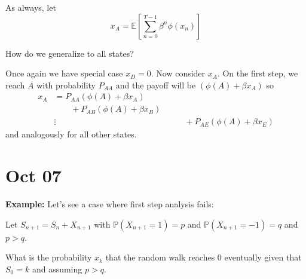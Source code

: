 \documentclass[12pt]{report}
\renewcommand{\P}{\mathbb{P}}
\newcommand{\E}{\mathbb{E}}
\begin{document}
    As always, let 
    \[x_A = \E\left[\sum_{n=0}^{T-1} \beta^n \phi(x_n) \right]\]
    
    How do we generalize to all states? 
    
    Once again we have special case $x_D = 0$. Now consider $x_A$. On the first step, we reach $A$ with probability $P_{AA}$ and the payoff will be $(\phi(A) + \beta x_A)$ so 
    \begin{align*}
        x_A &= P_{AA} (\phi(A) + \beta x_A)\\ 
        &\qquad + P_{AB}(\phi(A) + \beta x_B)\\ 
        &\vdots 
        &\qquad + P_{AE}(\phi(A) + \beta x_E)
    \end{align*}
    and analogously for all other states.

\section{Oct 07}
    \textbf{Example:} Let's see a case where first step analysis fails: 

    Let $S_{n+1} = S_n + X_{n+1}$ with $\P(X_{n+1} = 1) = p$ and $\P(X_{n+1} = -1) = q$ and $p> q$.

    \begin{center}
    \end{center}

    What is the probability $x_k$ that the random walk reaches $0$ eventually given that $S_0 = k$ and assuming $p > q$. 
    
\end{document}
